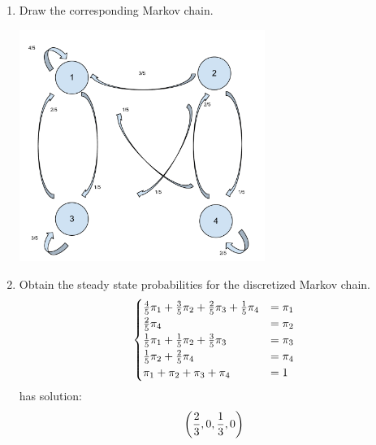 \documentclass[12pt]{article}
\begin{document}
\begin{enumerate}
\begin{enumerate}
	\item Draw the corresponding Markov chain.

\begin{center}
\includegraphics[width=8cm]{Markov_Chains_Ex_5-d.pdf}
\end{center}

	\item Obtain the steady state probabilities for the discretized Markov chain.
$$
\begin{cases}
{4\over5}\pi_1+{3\over5}\pi_2+{2\over5}\pi_3+{1\over5}\pi_4&=\pi_1\\
{2\over5}\pi_4&=\pi_2\\
{1\over5}\pi_1+{1\over5}\pi_2+{3\over5}\pi_3&=\pi_3\\
{1\over5}\pi_2+{2\over5}\pi_4&=\pi_4\\
\pi_1+\pi_2+\pi_3+\pi_4&=1
\end{cases}
$$
has solution:
$$\left({2\over3},0,{1\over3},0\right)$$
\end{enumerate}

\end{enumerate}
\end{document}
